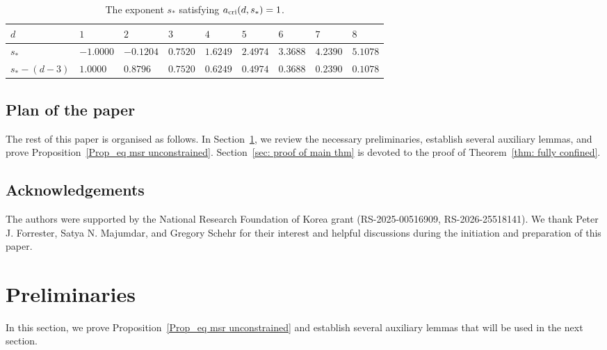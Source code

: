 \documentclass{amsart}
\theoremstyle{plain}
\theoremstyle{remark}
\numberwithin{equation}{section}
\begin{document}
 \begin{table}[t]
    \centering
    \renewcommand{\arraystretch}{1.5}
    \begin{tabular}{K{1.8cm} K{1.2cm} K{1.2cm} K{1.2cm} K{1.2cm} K{1.2cm} K{1.2cm} K{1.2cm} K{1.2cm}}
        \hline
        $d$
            & $1$ & $2$ & $3$ & $4$ & $5$ & $6$ & $7$ & $8$ \\
        \hline
        $s_*$
            & $-1.0000$
            & $-0.1204$
            & $0.7520$
            & $1.6249$
            & $2.4974$
            & $3.3688$
            & $4.2390$
            & $5.1078$ \\
        \hline
        $s_*-(d-3)$
            & $1.0000$
            & $0.8796$
            & $0.7520$
            & $0.6249$
            & $0.4974$
            & $0.3688$
            & $0.2390$
            & $0.1078$ \\
        \hline
    \end{tabular}
    \caption{The exponent \(s_*\) satisfying \(a_{\rm cri}(d,s_*)=1\).}
    \label{tab:s-cri}
\end{table}
  

\subsection*{Plan of the paper} The rest of this paper is organised as follows. In Section~\ref{Section_prelim}, we review the necessary preliminaries, establish several auxiliary lemmas, and prove Proposition~\ref{Prop_eq msr unconstrained}. Section~\ref{sec: proof of main thm} is devoted to the proof of Theorem~\ref{thm: fully confined}.

\subsection*{Acknowledgements} The authors were supported by the National Research Foundation of Korea grant (RS-2025-00516909, RS-2026-25518141). We thank Peter J. Forrester, Satya N. Majumdar, and Gregory Schehr for their interest and helpful discussions during the initiation and preparation of this paper. 


\section{Preliminaries} \label{Section_prelim}

In this section, we prove Proposition~\ref{Prop_eq msr unconstrained} and establish several auxiliary lemmas that will be used in the next section.
\end{document}
